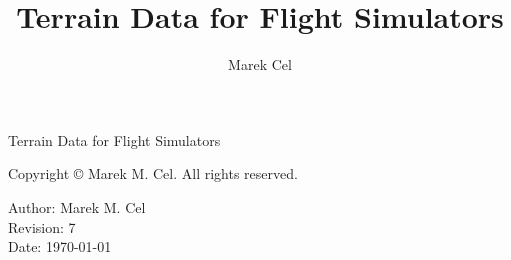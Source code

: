 \documentclass[12pt,a4paper]{report}
\title{Terrain Data for Flight Simulators}
\author{Marek Cel}
\date{}
\begin{document}
  
  \begin{titlepage}
    \centering
    {\huge Terrain Data for Flight Simulators\par}
  \end{titlepage}
  

  \noindent Copyright \copyright{} \the\year{} Marek M. Cel. All rights reserved.

  \noindent Author: Marek M. Cel \\
  Revision: 7 \\
  Date: \today

  
  
  {
    \clearpage
    \setlength{\parskip}{0em}
    \tableofcontents
  }

  
  
  
  
  
  \clearpage
   
  
  
\end{document}

